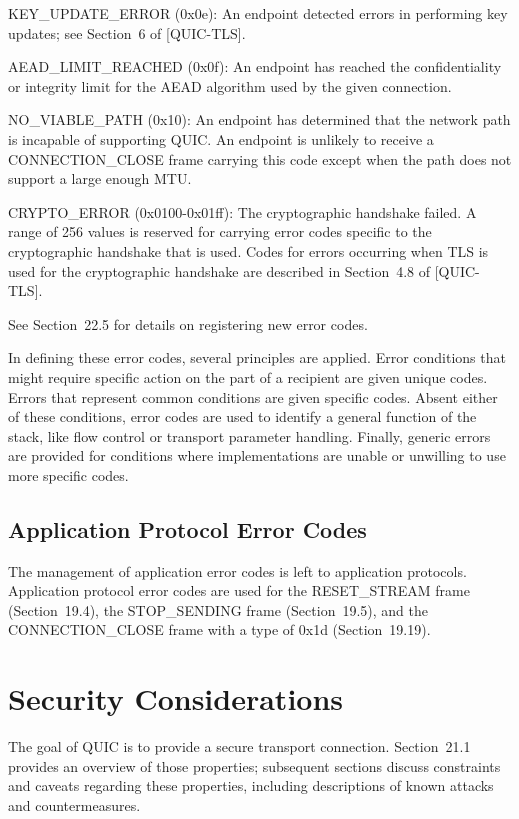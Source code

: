\documentclass{article}
\begin{document}
KEY\_UPDATE\_ERROR (0x0e):  An endpoint detected errors in performing key updates; see Section~6 of [QUIC-TLS].

AEAD\_LIMIT\_REACHED (0x0f):  An endpoint has reached the confidentiality or integrity limit for the AEAD algorithm used by the given connection.

NO\_VIABLE\_PATH (0x10):  An endpoint has determined that the network path is incapable of supporting QUIC.  An endpoint is unlikely to receive a CONNECTION\_CLOSE frame carrying this code except when the path does not support a large enough MTU.

CRYPTO\_ERROR (0x0100-0x01ff):  The cryptographic handshake failed.  A range of 256 values is reserved for carrying error codes specific to the cryptographic handshake that is used.  Codes for errors occurring when TLS is used for the cryptographic handshake are described in Section~4.8 of [QUIC-TLS].

See Section~22.5 for details on registering new error codes.

In defining these error codes, several principles are applied.  Error conditions that might require specific action on the part of a recipient are given unique codes.  Errors that represent common conditions are given specific codes.  Absent either of these conditions, error codes are used to identify a general function of the stack, like flow control or transport parameter handling. Finally, generic errors are provided for conditions where implementations are unable or unwilling to use more specific codes.

\subsection{Application Protocol Error Codes}

The management of application error codes is left to application protocols.  Application protocol error codes are used for the RESET\_STREAM frame (Section~19.4), the STOP\_SENDING frame (Section~19.5), and the CONNECTION\_CLOSE frame with a type of 0x1d (Section~19.19).

\section{Security Considerations}

The goal of QUIC is to provide a secure transport connection. Section~21.1 provides an overview of those properties; subsequent sections discuss constraints and caveats regarding these properties, including descriptions of known attacks and countermeasures.
\end{document}

